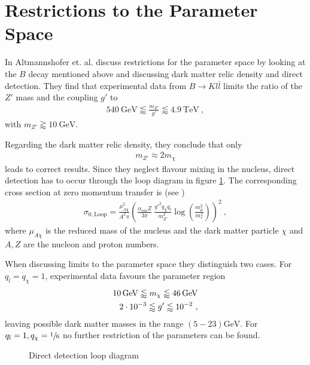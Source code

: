 \section{Restrictions to the Parameter Space}
In \cite{Z} Altmannshofer et. al. discuss restrictions for the parameter space by looking at the $B$ decay mentioned above and discussing dark matter relic density and direct detection. They find that experimental data from $B\rightarrow Kl\bar{l}$ limits the ratio of the $Z'$ mass and the coupling $g'$ to
\begin{align}
	\SI{540}{\giga\electronvolt}\lessapprox\frac{m_{Z'}}{g'}\lessapprox\SI{4.9}{\tera\electronvolt} \ ,
\end{align}
with $m_{Z'}\gtrapprox\SI{10}{\giga\electronvolt}$.


Regarding the dark matter relic density, they conclude that only
\begin{align}
	m_{Z'}\approx 2m_\chi
\end{align}
leads to correct results. Since they neglect flavour mixing in the nucleus, direct detection has to occur through the loop diagram in figure \ref{fig:Loop}. The corresponding cross section at zero momentum transfer is (see \cite{Z})
\begin{align}
	\sigma_{0,\text{Loop}} = \frac{\mu_{A\chi}^2}{A^2\pi}\left(\frac{\alpha_{em}Z}{3\pi}\ \frac{g'^2q_\chi q_l}{m_{Z'}^2}\log\left(\frac{m_\mu^2}{m_\tau^2}\right)\right)^2 \ ,
\end{align}
where $\mu_{A\chi}$ is the reduced mass of the nucleus and the dark matter particle $\chi$ and $A,Z$ are the nucleon and proton numbers.


When discussing limits to the parameter space they distinguish two cases. For $q_l=q_\chi=1$, experimental data favours the parameter region
\begin{align}
	\SI{10}{\giga\electronvolt}\lessapprox m_\chi\lessapprox\SI{46}{\giga\electronvolt}\notag \\
	\SI{2e-3}{}\lessapprox g'\lessapprox\SI{e-2}{} \ ,
\end{align}
leaving possible dark matter masses in the range $(5-23)\si{\giga\electronvolt}$. For $q_l=1,q_\chi=\sfrac{1}{6}$ no further restriction of the parameters can be found.
\begin{figure}
	\centering
	
	\caption{Direct detection loop diagram}
	\label{fig:Loop}
\end{figure}


